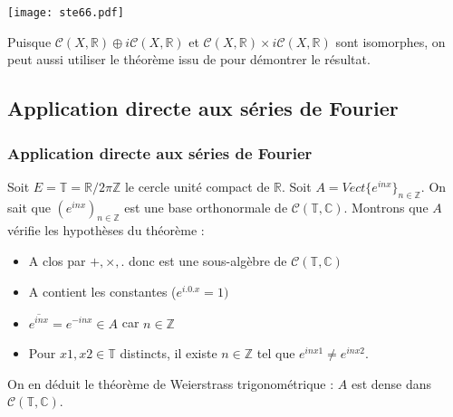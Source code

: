 \documentclass[
	10pt, %
	xcolor={svgnames}
]{beamer}
\begin{document}

\begin{frame}

	\center\texttt{[image: ste66.pdf]}

	\par Puisque \( \mathcal{C}(X,\mathbb{R}) \oplus i\mathcal{C}(X,\mathbb{R}) \) et \( \mathcal{C}(X,\mathbb{R}) \times i\mathcal{C}(X,\mathbb{R}) \) sont isomorphes, on peut aussi utiliser le théorème issu de \cite{stephenson1968spaces} pour démontrer le résultat. 
	\nocite{nlab:direct_sum_of_banach_spaces}
	\nocite{nlab:stone-weierstrass_theorem}
\end{frame}



\begin{frame}
\subsection{Application directe aux séries de Fourier}
\frametitle{Application directe aux séries de Fourier}

\par Soit \( E = \mathbb{T} = \mathbb{R}/2\pi\mathbb{Z} \) le cercle unité compact de \( \mathbb{R} \). 
Soit \(A = Vect\{e^{inx}\}_{n \in \mathbb{Z}}\). On sait que \( (e^{inx})_{n \in \mathbb{Z}} \) est une base orthonormale de \( \mathcal{C}(\mathbb{T},\mathbb{C}) \). Montrons que \( A \) vérifie les hypothèses du théorème :
\begin{itemize}
	\item A clos par \( +,\times,. \) donc est une sous-algèbre de \( \mathcal{C}(\mathbb{T},\mathbb{C}) \)
	\item A contient les constantes (\( e^{i.0.x} = 1) \)
	\item \( \overline{e^{inx}} = e^{-inx} \in A \) car \( n \in \mathbb{Z} \)
	\item Pour \( x1, x2 \in \mathbb{T} \) distincts, il existe \( n \in \mathbb{Z} \) tel que 
		\( e^{inx1} \neq e^{inx2} \).
\end{itemize}

On en déduit le théorème de Weierstrass trigonométrique : \( A \) est dense dans \( \mathcal{C}(\mathbb{T},\mathbb{C}) \).

\end{frame}
\end{document}
